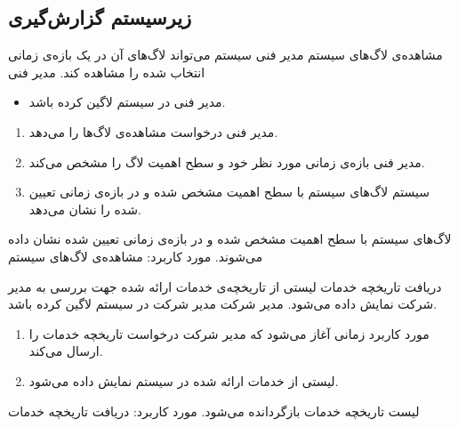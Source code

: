 \subsection{زیرسیستم گزارش‌گیری}




\usecase
{
	مشاهده‌ی لاگ‌های سیستم
}
{}
{
مدیر فنی سیستم می‌تواند لاگ‌های آن در یک بازه‌ی زمانی انتخاب شده را مشاهده کند.
}
{
	مدیر فنی
}
{}
{
	\begin{itemize}
		\vspace*{-0.6cm}
		\item 
مدیر فنی در سیستم لاگین کرده باشد.
	\end{itemize}
}
{
	\vspace*{-0.6cm}
	\begin{enumerate}
		\item 
مدیر فنی درخواست مشاهده‌ی لاگ‌ها را می‌دهد.
		\item
		مدیر فنی بازه‌ی زمانی مورد نظر خود و سطح اهمیت لاگ را مشخص می‌کند.
		\item
		سیستم لاگ‌های سیستم با سطح اهمیت مشخص شده و در بازه‌ی زمانی تعیین شده را نشان می‌دهد.		
	\end{enumerate}
}
{
لاگ‌های سیستم با سطح اهمیت مشخص شده و در بازه‌ی زمانی تعیین شده نشان داده می‌شوند.
}
{
}
{
	مورد کاربرد: مشاهده‌ی لاگ‌های سیستم
}



\usecase
{دریافت تاریخچه خدمات}
{}
{لیستی از تاریخچه‌ی خدمات ارائه شده جهت بررسی به مدیر شرکت نمایش داده می‌شود.}
{مدیر شرکت}
{}
{مدیر شرکت در سیستم لاگین کرده باشد.}
{
	\vspace*{-0.6cm}
	\begin{enumerate}
		\item مورد کاربرد زمانی آغاز می‌شود که مدیر شرکت درخواست تاریخچه خدمات را ارسال می‌کند.
		\item 
		لیستی از خدمات ارائه شده در سیستم نمایش داده می‌شود.
	\end{enumerate}
}
{لیست تاریخچه خدمات بازگردانده می‌شود.}
{
}
{
	مورد کاربرد: دریافت تاریخچه خدمات
}


